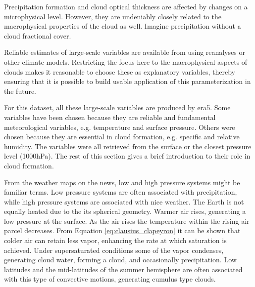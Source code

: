 Precipitation formation and cloud optical thickness are affected by changes on a microphysical level. However, they are undeniably closely related to the macrophysical properties of the cloud as well. Imagine precipitation without a cloud fractional cover. 

Reliable estimates of large-scale variables are available from using reanalyses or other climate models. Restricting the focus here to the macrophysical aspects of clouds makes it reasonable to choose these as explanatory variables, thereby ensuring that it is possible to build usable application of this parameterization in the future.

For this dataset, all these large-scale variables are produced by \acrshort{era5}. Some variables have been chosen because they are reliable and fundamental meteorological variables, e.g. temperature and surface pressure. Others were chosen because they are essential in cloud formation, e.g. specific and relative humidity. The variables were all retrieved from the surface or the closest pressure level (1000hPa). The rest of this section gives a brief introduction to their role in cloud formation.

From the weather maps on the news, low and high pressure systems might be familiar terms. Low pressure systems are often associated with precipitation, while high pressure systems are associated with nice weather. The Earth is not equally heated due to the its spherical geometry. Warmer air rises, generating a low pressure at the surface. As the air rises the temperature within the rising air parcel decreases. From Equation \eqref{eq:clausius_clapeyron} it can be shown that colder air can retain less vapor, enhancing the rate at which saturation is achieved. Under supersaturated conditions some of the vapor condenses, generating cloud water, forming a cloud, and occasionally precipitation. Low latitudes and the mid-latitudes of the summer hemisphere are often associated with this type of convective motions, generating cumulus type clouds. 

